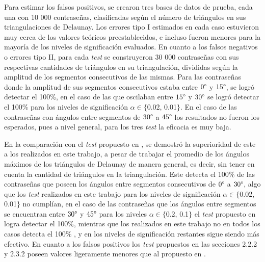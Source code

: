 \documentclass[12pt]{report}
\begin{document}
Para estimar los falsos positivos, se crearon tres bases de datos de prueba, cada una con 10 000 contraseñas, clasificadas según el número de triángulos en sus triangulaciones de Delaunay. Los errores tipo I estimados en cada caso estuvieron muy cerca de los valores teóricos preestablecidos, e incluso fueron menores para la mayoría de los niveles de significación evaluados. En cuanto a los falsos negativos o errores tipo II, para cada \textit{test} se construyeron 30 000 contraseñas con sus respectivas cantidades de triángulos en  su triangulación, divididas según la amplitud de los segmentos consecutivos de las mismas. Para las contraseñas donde  la amplitud de sus segmentos consecutivos estaba entre $0\degree$ y $15\degree$, se logró detectar el 100\%, en el caso de las que oscilaban entre $15\degree$ y $30\degree$  se logró detectar el 100\% para los niveles de significación $\alpha \in \{$0.02, 0.01$\}$. En el caso de las contraseñas con ángulos entre segmentos de $30\degree$ a $45\degree$  los resultados no fueron los esperados, pues a nivel general, para los tres \textit{test}   la eficacia es muy baja.

En la comparación con el \textit{test} propuesto en \cite{13}, se demostró la superioridad de este  a los realizados en este trabajo, a pesar de trabajar el promedio de los ángulos máximos de los triángulos de Delaunay de manera general, es decir, sin tener en cuenta la cantidad de triángulos en  la triangulación. Este detecta el 100\% de las contraseñas que poseen los ángulos entre segmentos consecutivos de $0\degree$ a $30\degree$, algo que los \textit{test} realizados en este trabajo para los niveles de significación $\alpha \in \{$0.02, 0.01$\}$ no cumplían, en el caso de las contraseñas que los ángulos entre segmentos se encuentran entre $30\degree$ y $45\degree$ para los niveles $\alpha \in \{$0.2, 0.1$\}$ el \textit{test} propuesto en \cite{13} logra detectar el 100\%, mientras que los realizados en este trabajo no en todos los casos detecta el 100\% , y en los niveles de significación restantes sigue siendo más efectivo. En cuanto a los falsos positivos los \textit{test} propuestos en las secciones 2.2.2 y 2.3.2 poseen valores ligeramente menores que al propuesto en \cite{13}. 
\end{document}

